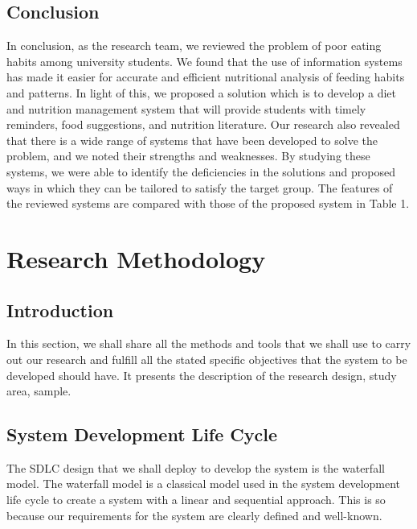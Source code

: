 \documentclass {article}
\begin{document}
\subsection{Conclusion}
\noindent In conclusion, as the research team, we reviewed the problem of poor eating habits among university students. We found that the use of information systems has made it easier for accurate and efficient nutritional analysis of feeding habits and patterns. In light of this, we proposed a solution which is to develop a diet and nutrition management system that will provide students with timely reminders, food suggestions, and nutrition literature. Our research also revealed that there is a wide range of systems that have been developed to solve the problem, and we noted their strengths and weaknesses. By studying these systems, we were able to identify the deficiencies in the solutions and proposed ways in which they can be tailored to satisfy the target group. The features of the reviewed systems are compared with those of the proposed system in Table 1.\\

\newpage
\section{Research Methodology}
\subsection{Introduction }
\noindent In this section, we shall share all the methods and tools that we shall use to carry out our research and fulfill all the stated specific objectives that the system to be developed should have.  It presents the description of the research design, study area, sample. 

\subsection{System Development Life Cycle}
\noindent The SDLC design that we shall deploy to develop the system is the waterfall model. The waterfall model is a classical model used in the system development life cycle to create a system with a linear and sequential approach. This is so because our requirements for the system are clearly defined and well-known.

\end{document}
